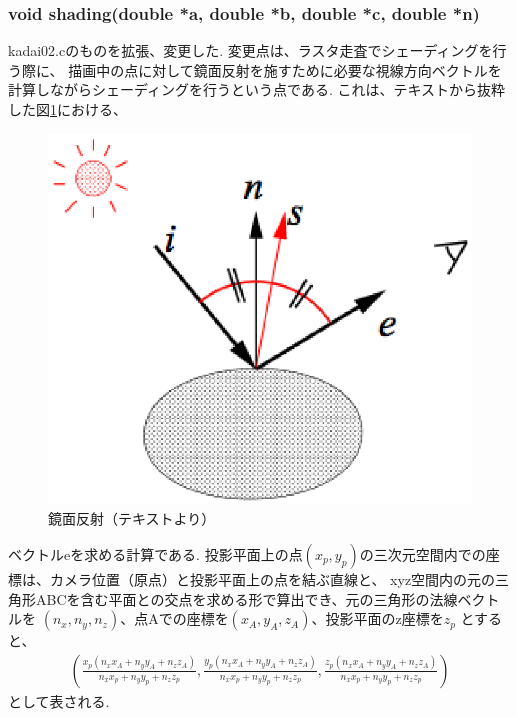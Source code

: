 \documentclass[a4j,dvipdfmx]{jsarticle}
\begin{document}
\subsubsection{void shading(double *a, double *b, double *c, double *n)}
kadai02.cのものを拡張、変更した.
変更点は、ラスタ走査でシェーディングを行う際に、
描画中の点に対して鏡面反射を施すために必要な視線方向ベクトルを計算しながらシェーディングを行うという点である.
これは、テキストから抜粋した図\ref{fig:mirref}における、
\begin{figure}[htbp]
  \begin{center}
    \includegraphics[clip,scale=0.5]{images/mirrorref.eps}
    \caption{鏡面反射（テキストより）}
  \end{center}
  \label{fig:mirref}
\end{figure}
ベクトルeを求める計算である. 
投影平面上の点$(x_{p}, y_{p})$の三次元空間内での座標は、カメラ位置（原点）と投影平面上の点を結ぶ直線と、
xyz空間内の元の三角形ABCを含む平面との交点を求める形で算出でき、元の三角形の法線ベクトルを
$(n_{x}, n_{y}, n_{z})$、点Aでの座標を$(x_{A}, y_{A}, z_{A})$、投影平面のz座標を$z_{p}$
とすると、
\begin{eqnarray}
(\frac{x_{p}(n_{x}x_{A}+n_{y}y_{A}+n_{z}z_{A})}{n_{x}x_{p} + n_{y}y_{p} + n_{z}z_{p}}, 
\frac{y_{p}(n_{x}x_{A}+n_{y}y_{A}+n_{z}z_{A})}{n_{x}x_{p} + n_{y}y_{p} + n_{z}z_{p}}, 
\frac{z_{p}(n_{x}x_{A}+n_{y}y_{A}+n_{z}z_{A})}{n_{x}x_{p} + n_{y}y_{p} + n_{z}z_{p}})
\end{eqnarray}
として表される.
\end{document}
